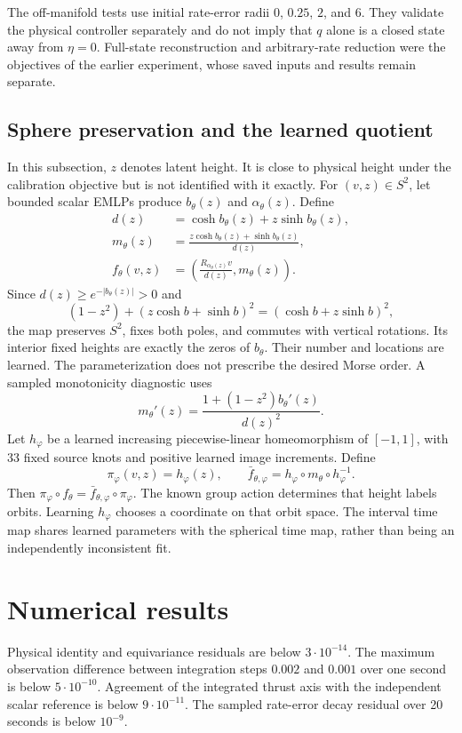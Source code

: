 \documentclass[11pt]{article}
\begin{document}
The off-manifold tests use initial rate-error radii $0$, $0.25$, $2$, and $6$. They validate the physical controller separately and do not imply that $q$ alone is a closed state away from $\eta=0$. Full-state reconstruction and arbitrary-rate reduction were the objectives of the earlier experiment, whose saved inputs and results remain separate.

\subsection*{Sphere preservation and the learned quotient}
In this subsection, $z$ denotes latent height. It is close to physical height under the calibration objective but is not identified with it exactly. For $(v,z)\in S^2$, let bounded scalar EMLPs produce $b_\theta(z)$ and $\alpha_\theta(z)$. Define
\begin{align*}
 d(z)&=\cosh b_\theta(z)+z\sinh b_\theta(z),\\
 m_\theta(z)&=\frac{z\cosh b_\theta(z)+\sinh b_\theta(z)}{d(z)},\\
 f_\theta(v,z)&=\left(\frac{R_{\alpha_\theta(z)}v}{d(z)},m_\theta(z)\right).
\end{align*}
Since $d(z)\ge e^{-|b_\theta(z)|}>0$ and
\[
 (1-z^2)+(z\cosh b+\sinh b)^2=(\cosh b+z\sinh b)^2,
\]
the map preserves $S^2$, fixes both poles, and commutes with vertical rotations. Its interior fixed heights are exactly the zeros of $b_\theta$. Their number and locations are learned. The parameterization does not prescribe the desired Morse order. A sampled monotonicity diagnostic uses
\[
 m_\theta'(z)=\frac{1+(1-z^2)b_\theta'(z)}{d(z)^2}.
\]
Let $h_\varphi$ be a learned increasing piecewise-linear homeomorphism of $[-1,1]$, with 33 fixed source knots and positive learned image increments. Define
\[
 \pi_\varphi(v,z)=h_\varphi(z),\qquad
 \bar f_{\theta,\varphi}=h_\varphi\circ m_\theta\circ h_\varphi^{-1}.
\]
Then $\pi_\varphi\circ f_\theta=\bar f_{\theta,\varphi}\circ\pi_\varphi$. The known group action determines that height labels orbits. Learning $h_\varphi$ chooses a coordinate on that orbit space. The interval time map shares learned parameters with the spherical time map, rather than being an independently inconsistent fit.

\section{Numerical results}
Physical identity and equivariance residuals are below $3\cdot10^{-14}$. The maximum observation difference between integration steps $0.002$ and $0.001$ over one second is below $5\cdot10^{-10}$. Agreement of the integrated thrust axis with the independent scalar reference is below $9\cdot10^{-11}$. The sampled rate-error decay residual over 20 seconds is below $10^{-9}$.
\end{document}
